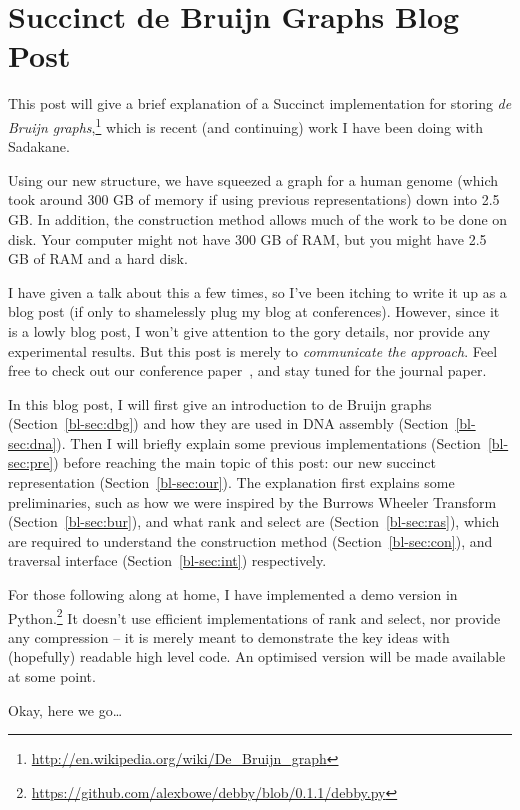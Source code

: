 \chapter{Succinct de Bruijn Graphs Blog Post}

This post will give a brief explanation of a Succinct implementation for storing \emph{de Bruijn graphs},\footnote{\url{http://en.wikipedia.org/wiki/De_Bruijn_graph}} which is recent (and continuing) work I have been doing with Sadakane.

Using our new structure, we have squeezed a graph for a human genome (which took around 300 GB of memory if using previous representations) down into 2.5 GB. In addition, the construction method allows much of the work to be done on disk. Your computer might not have 300 GB of RAM, but you might have 2.5 GB of RAM and a hard disk.

I have given a talk about this a few times, so I've been itching to write it up as a blog post (if only to shamelessly plug my blog at conferences). However, since it is a lowly blog post, I won't give attention to the gory details, nor provide any experimental results. But this post is merely to \emph{communicate the approach}. Feel free to check out our conference paper~\cite{bowe}, and stay tuned for the journal paper.

In this blog post, I will first give an introduction to de Bruijn graphs (Section~\ref{bl-sec:dbg}) and how they are used in DNA assembly (Section~\ref{bl-sec:dna}). Then I will briefly explain some previous implementations (Section~\ref{bl-sec:pre}) before reaching the main topic of this post: our new succinct representation (Section~\ref{bl-sec:our}). The explanation first explains some preliminaries, such as how we were inspired by the Burrows Wheeler Transform (Section~\ref{bl-sec:bur}), and what rank and select are (Section~\ref{bl-sec:ras}), which are required to understand the construction method (Section~\ref{bl-sec:con}), and traversal interface (Section~\ref{bl-sec:int}) respectively.

For those following along at home, I have implemented a demo version in Python.\footnote{\url{https://github.com/alexbowe/debby/blob/0.1.1/debby.py}} It doesn't use efficient implementations of rank and select, nor provide any compression -- it is merely meant to demonstrate the key ideas with (hopefully) readable high level code. An optimised version will be made available at some point.

Okay, here we go\ldots

